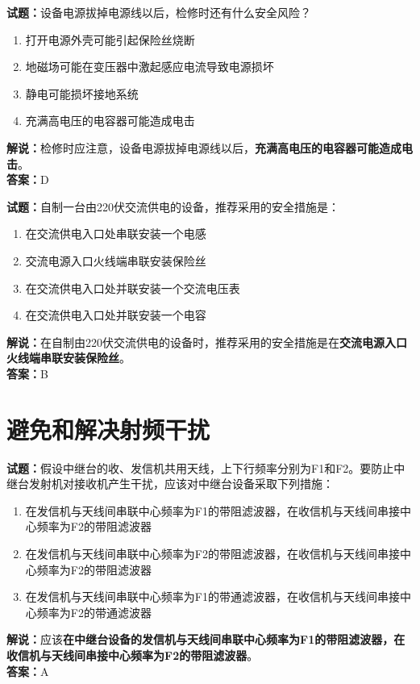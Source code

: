 \documentclass{ctexbook}
\begin{document}
\bigskip


\noindent\textbf{试题：}设备电源拔掉电源线以后，检修时还有什么安全风险？
\begin{enumerate}[leftmargin=3em]
	\item 打开电源外壳可能引起保险丝烧断
	\item 地磁场可能在变压器中激起感应电流导致电源损坏
	\item 静电可能损坏接地系统
	\item 充满高电压的电容器可能造成电击
\end{enumerate}
\noindent\textbf{解说：}检修时应注意，设备电源拔掉电源线以后，\textbf{充满高电压的电容器可能造成电击}。\\\noindent\textbf{答案：}D

\bigskip


\noindent\textbf{试题：}自制一台由220伏交流供电的设备，推荐采用的安全措施是：
\begin{enumerate}[leftmargin=3em]
	\item 在交流供电入口处串联安装一个电感
	\item 交流电源入口火线端串联安装保险丝
	\item 在交流供电入口处并联安装一个交流电压表
	\item 在交流供电入口处并联安装一个电容
\end{enumerate}
\noindent\textbf{解说：}在自制由220伏交流供电的设备时，推荐采用的安全措施是在\textbf{交流电源入口火线端串联安装保险丝}。\\\noindent\textbf{答案：}B













\chapter{避免和解决射频干扰}

\newpage

\noindent\textbf{试题：}假设中继台的收、发信机共用天线，上下行频率分别为F1和F2。要防止中继台发射机对接收机产生干扰，应该对中继台设备采取下列措施：
\begin{enumerate}[leftmargin=3em]
	\item 在发信机与天线间串联中心频率为F1的带阻滤波器，在收信机与天线间串接中心频率为F2的带阻滤波器
	\item 在发信机与天线间串联中心频率为F2的带阻滤波器，在收信机与天线间串接中心频率为F2的带阻滤波器
	\item 在发信机与天线间串联中心频率为F1的带通滤波器，在收信机与天线间串接中心频率为F2的带通滤波器
\end{enumerate}
\noindent\textbf{解说：}应该\textbf{在中继台设备的发信机与天线间串联中心频率为F1的带阻滤波器，在收信机与天线间串接中心频率为F2的带阻滤波器}。\\\noindent\textbf{答案：}A
\end{document}
